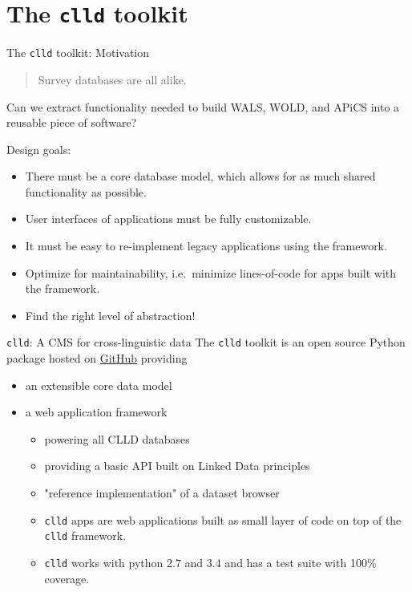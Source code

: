 \documentclass{beamer}
\begin{document}
\section{The \texttt{clld} toolkit}

\begin{frame}{The \texttt{clld} toolkit: Motivation}
\begin{quote}
Survey databases are all alike.
\end{quote}
Can we extract functionality needed to build WALS, WOLD, and APiCS into a reusable
piece of software?

Design goals:
\begin{itemize}
\item There must be a core database model, which allows for as much shared
functionality as possible.
\item User interfaces of applications must be fully customizable.
\item It must be easy to re-implement legacy applications using the framework.
\item Optimize for maintainability, i.e.~minimize lines-of-code for apps built
with the framework.
\item Find the right level of abstraction!
\end{itemize}
\end{frame}


\begin{frame}{\texttt{clld}: A CMS for cross-linguistic data}
The \texttt{clld} toolkit is an open source Python package
hosted on \href{https://github.com/clld/clld}{GitHub}
providing
\begin{itemize}
\item an extensible core data model
\item a web application framework
\begin{itemize}
\item powering all CLLD databases
\item providing a basic API built on Linked Data principles
\item "reference implementation" of a dataset browser
\item \texttt{clld} apps are web applications built as small layer of code on top
of the \texttt{clld} framework.
\item \texttt{clld} works with python 2.7 and 3.4 and has a test suite with
100\% coverage.
\end{itemize}
\end{itemize}
\end{frame}
\end{document}
